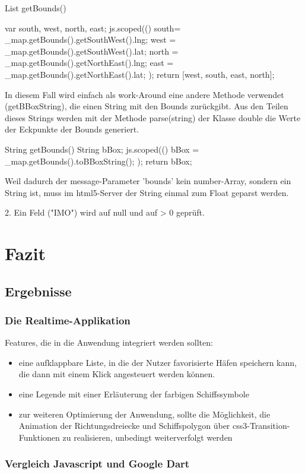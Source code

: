   List getBounds(){
    var south, west, north, east;
    js.scoped((){
    south= \_map.getBounds().getSouthWest().lng;
        west = \_map.getBounds().getSouthWest().lat;
        north = \_map.getBounds().getNorthEast().lng;
        east = \_map.getBounds().getNorthEast().lat;
 });
return [west, south, east, north];
    
In diesem Fall wird einfach als work-Around eine andere Methode verwendet (getBBoxString), die einen String mit den Bounds zurückgibt. Aus den Teilen dieses Strings werden mit der Methode parse(string) der Klasse double die Werte der Eckpunkte der Bounds generiert.

String getBounds(){
    String bBox;
    js.scoped((){
      bBox = \_map.getBounds().toBBoxString();
    });
    return bBox;
  }

 Weil dadurch der message-Parameter 'bounds' kein number-Array, sondern ein String ist, muss im html5-Server der String einmal zum Float geparst werden.



2. Ein Feld ("IMO") wird auf null und auf > 0 geprüft.


\chapter{Fazit}\label{Fazit}
 \section{Ergebnisse }
\subsection{Die Realtime-Applikation}


Features, die in die Anwendung integriert werden sollten:
\begin{itemize}
\item eine aufklappbare Liste, in die der Nutzer favorisierte Häfen speichern kann, die dann mit einem Klick angesteuert werden können.
\item eine Legende mit einer Erläuterung der farbigen Schiffssymbole
\item zur weiteren Optimierung der Anwendung, sollte die Möglichkeit, die Animation der Richtungsdreiecke und Schiffspolygon über css3-Transition-Funktionen zu realisieren, unbedingt weiterverfolgt werden
\end{itemize}

\subsection{Vergleich Javascript und Google Dart}

}
